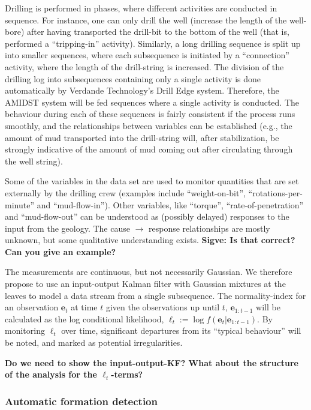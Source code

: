 Drilling is performed in phases, where different activities are conducted in sequence. For instance, one can only drill the well (increase the length of the well-bore) after having transported the drill-bit to the bottom of the well (that is, performed a ``tripping-in'' activity). Similarly, a long drilling sequence is split up into smaller sequences, where each subsequence is initiated by a ``connection'' activity, where the length of the drill-string is increased.
The division of the drilling log into subsequences containing only a single activity is done automatically by Verdande Technology's Drill Edge system. 
Therefore, the AMIDST system will be fed sequences where a single activity is conducted. 
The behaviour during each of these sequences  is fairly consistent if the process runs smoothly, and the relationships between variables can be established (e.g., the amount of mud transported into the drill-string will, after stabilization, be strongly indicative of the amount of mud coming out after circulating through the well string). 

Some of the variables in the data set are used to monitor quantities that are set externally by the drilling crew (examples include ``weight-on-bit'', ``rotations-per-minute'' and ``mud-flow-in''). Other variables, like ``torque'', ``rate-of-penetration'' and ``mud-flow-out'' can be understood as  (possibly delayed) responses to the input from the geology. The cause $\rightarrow$ response relationships are mostly unknown, but some qualitative understanding exists. {\bf Sigve: Is that correct? Can you give an example?}

The measurements are continuous, but not necessarily Gaussian. We therefore propose to use an input-output Kalman filter with Gaussian mixtures at the leaves to model a data stream from a single subsequence. The normality-index for an observation ${\bm e}_t$ at time $t$ given the observations up until $t$, ${\bm e}_{1:t-1}$ will be calculated as the log conditional likelihood,  $\ell_t := \log f\left({\bm e}_t|{\bm e}_{1:t-1}\right)$. By monitoring  $\ell_t$ over time, significant departures from its ``typical behaviour'' will be noted, and marked as potential irregularities.

{\bf Do we need to show the input-output-KF? What about the structure of the analysis for the $\ell_t$-terms?}


\subsubsection{Automatic formation detection}\label{SubSection:DetectionFormation}


